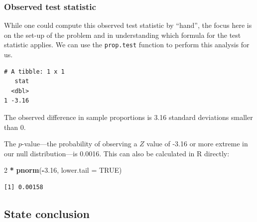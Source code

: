 \documentclass[12pt,]{krantz}
\makeatletter
\newenvironment{Shaded}{\begin{snugshade}}{\end{snugshade}}
\newcommand{\KeywordTok}[1]{\textcolor[rgb]{0.27,0.27,0.27}{\textbf{#1}}}
\newcommand{\DataTypeTok}[1]{\textcolor[rgb]{0.27,0.27,0.27}{#1}}
\newcommand{\DecValTok}[1]{\textcolor[rgb]{0.06,0.06,0.06}{#1}}
\newcommand{\FloatTok}[1]{\textcolor[rgb]{0.06,0.06,0.06}{#1}}
\newcommand{\StringTok}[1]{\textcolor[rgb]{0.5,0.5,0.5}{#1}}
\newcommand{\OtherTok}[1]{\textcolor[rgb]{0.37,0.37,0.37}{#1}}
\newcommand{\OperatorTok}[1]{\textcolor[rgb]{0.43,0.43,0.43}{\textbf{#1}}}
\newcommand{\NormalTok}[1]{#1}
\newenvironment{kframe}{%
\medskip{}
\setlength{\fboxsep}{.8em}
 \def\at@end@of@kframe{}%
 \ifinner\ifhmode%
  \def\at@end@of@kframe{\end{minipage}}%
  \begin{minipage}{\columnwidth}%
 \fi\fi%
 \def\FrameCommand##1{\hskip\@totalleftmargin \hskip-\fboxsep
 \colorbox{shadecolor}{##1}\hskip-\fboxsep
     \hskip-\linewidth \hskip-\@totalleftmargin \hskip\columnwidth}%
 \MakeFramed {\advance\hsize-\width
   \@totalleftmargin\z@ \linewidth\hsize
   \@setminipage}}%
 {\par\unskip\endMakeFramed%
 \at@end@of@kframe}
\renewenvironment{Shaded}{\begin{kframe}}{\end{kframe}}
\theoremstyle{definition}
\theoremstyle{definition}
\theoremstyle{definition}
\theoremstyle{remark}
\makeatother
\begin{document}
\subsubsection*{Observed test
statistic}\label{observed-test-statistic-2}


While one could compute this observed test statistic by ``hand'', the
focus here is on the set-up of the problem and in understanding which
formula for the test statistic applies. We can use the
\texttt{prop.test} function to perform this analysis for us.

\begin{Shaded}
\end{Shaded}

\begin{verbatim}
# A tibble: 1 x 1
   stat
  <dbl>
1 -3.16
\end{verbatim}

The observed difference in sample proportions is 3.16 standard
deviations smaller than 0.

The \(p\)-value---the probability of observing a \(Z\) value of -3.16 or
more extreme in our null distribution---is 0.0016. This can also be
calculated in R directly:

\begin{Shaded}
\begin{Highlighting}[]
\DecValTok{2} \OperatorTok{*}\StringTok{ }\KeywordTok{pnorm}\NormalTok{(}\OperatorTok{-}\FloatTok{3.16}\NormalTok{, }\DataTypeTok{lower.tail =} \OtherTok{TRUE}\NormalTok{)}
\end{Highlighting}
\end{Shaded}

\begin{verbatim}
[1] 0.00158
\end{verbatim}

\subsection{State conclusion}\label{state-conclusion-2}
\end{document}
